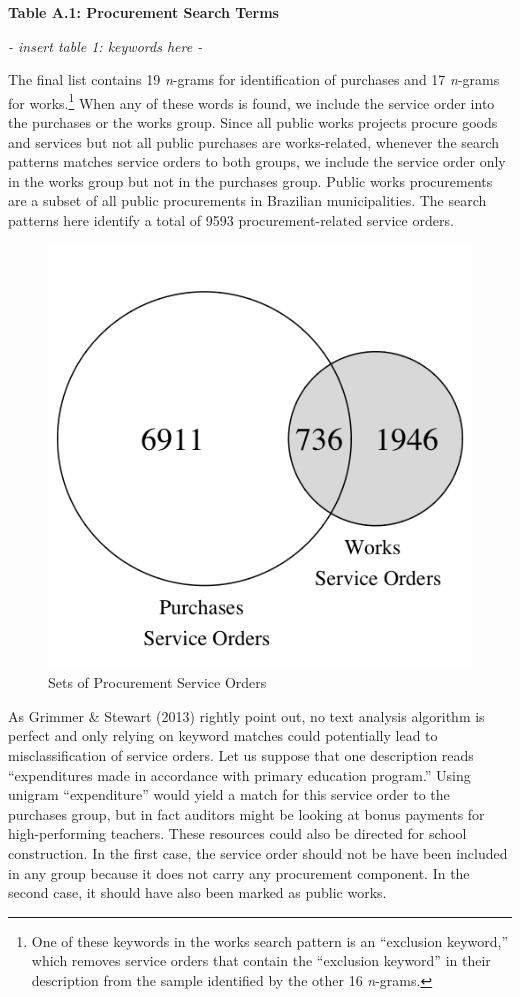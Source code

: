 \documentclass[]{article}
\let\rmarkdownfootnote\footnote%
\def\footnote{\protect\rmarkdownfootnote}
\theoremstyle{definition}
\theoremstyle{definition}
\theoremstyle{definition}
\theoremstyle{remark}
\begin{document}
\textbf{Table A.1: Procurement Search Terms}

\emph{- insert table 1: keywords here -}

The final list contains 19 \emph{n}-grams for identification of
purchases and 17 \emph{n}-grams for works.\footnote{One of these
  keywords in the works search pattern is an ``exclusion keyword,''
  which removes service orders that contain the ``exclusion keyword'' in
  their description from the sample identified by the other 16
  \emph{n}-grams.} When any of these words is found, we include the
service order into the purchases or the works group. Since all public
works projects procure goods and services but not all public purchases
are works-related, whenever the search patterns matches service orders
to both groups, we include the service order only in the works group but
not in the purchases group. Public works procurements are a subset of
all public procurements in Brazilian municipalities. The search patterns
here identify a total of 9593 procurement-related service orders.

\begin{figure}[htbp]

{\centering \includegraphics[width=0.3\linewidth]{venn} 

}

\caption{Sets of Procurement Service Orders}\label{fig:venn}
\end{figure}

As Grimmer \& Stewart (2013) rightly point out, no text analysis
algorithm is perfect and only relying on keyword matches could
potentially lead to misclassification of service orders. Let us suppose
that one description reads ``expenditures made in accordance with
primary education program.'' Using unigram ``expenditure'' would yield a
match for this service order to the purchases group, but in fact
auditors might be looking at bonus payments for high-performing
teachers. These resources could also be directed for school
construction. In the first case, the service order should not be have
been included in any group because it does not carry any procurement
component. In the second case, it should have also been marked as public
works.
\end{document}
